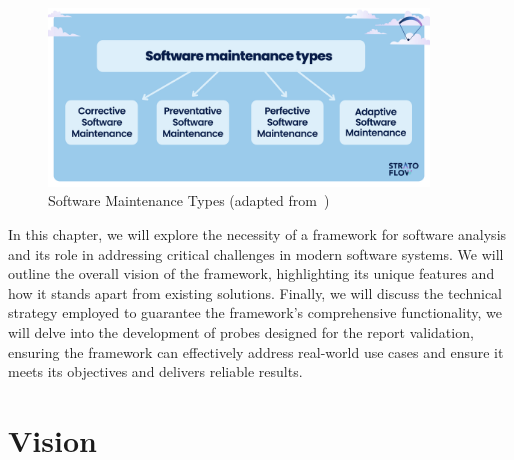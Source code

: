 \begin{figure}[H]
    \centering
    \includegraphics[width=0.9\textwidth]{figures/se_maintenance.png}
    \caption[Software Maintenance Types]{Software Maintenance Types (adapted from~\cite{stratoflow2025})}
	\label{fig_se_maintenance}
\end{figure}

In this chapter, we will explore the necessity of a framework for software analysis and its role in addressing critical challenges in modern software systems. We will outline the overall vision of the framework, highlighting its unique features and how it stands apart from existing solutions. Finally, we will discuss the technical strategy employed to guarantee the framework's comprehensive functionality, we will delve into the development of probes designed for the report validation, ensuring the framework can effectively address real-world use cases and ensure it meets its objectives and delivers reliable results.

\section{Vision}\label{sec:vision}

